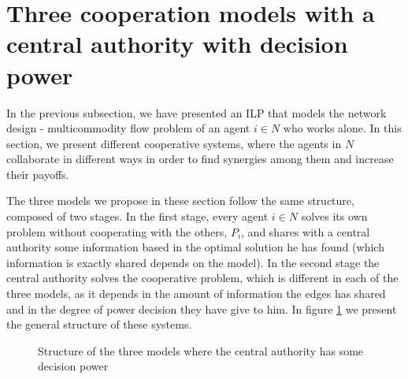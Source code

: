 \documentclass[authoryear]{elsarticle}
\begin{document}
\section{Three cooperation models with a central authority with decision power} \label{seq:centrmodels}

In the previous subsection, we have presented an ILP that models the network design - multicommodity flow problem of an agent $i\in N$ who works alone. In this section, we present different cooperative systems, where the agents in $N$ collaborate in different ways in order to find synergies among them and increase their payoffs.

The three models we propose in these section follow the same structure, composed of two stages. In the first stage, every agent $i\in N$ solves its own problem without cooperating with the others, $P_i$, and shares with a central authority some information based in the optimal solution he has found (which information is exactly shared depends on the model). In the second stage the central authority solves the cooperative problem, which is different in each of the three models, as it depends in the amount of information the edges has shared and in the degree of power decision they have give to him. In figure \ref{fig:generalflowchart} we present the general structure of these systems.


\begin{figure}[ht!]
\centering
\caption{Structure of the three models where the central authority has some decision power \label{fig:generalflowchart}}
\end{figure}
\end{document}
